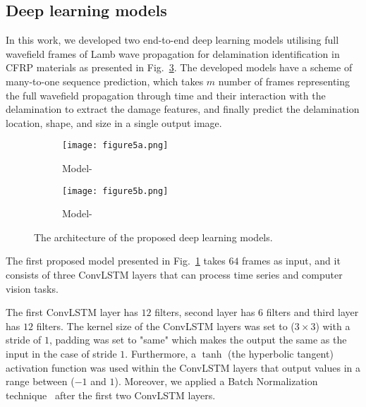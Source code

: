 \subsection{Deep learning models}
\label{proposed_approach}
In this work, we developed two end-to-end deep learning models utilising full wavefield frames of Lamb wave propagation for delamination identification in CFRP materials as presented in Fig.~\ref{fig:proposed_models}.
The developed models have a scheme of many-to-one sequence prediction, which takes \(m\) number of frames representing the full wavefield propagation through time and their interaction with the delamination to extract the damage features, and finally predict the delamination location, shape, and size in a single output image.
\begin{figure} [!h]
	\centering
	\begin{subfigure}[b]{0.49\textwidth}
		\centering
		\texttt{[image: figure5a.png]}
		\caption{Model-} %
		\label{fig:convlstm_model}
	\end{subfigure}
	\hfill
	\begin{subfigure}[b]{0.49\textwidth}
		\centering
		\texttt{[image: figure5b.png]}
		\caption{Model-} %
		\label{fig:AE_convlstm}
	\end{subfigure}
	\caption{The architecture of the proposed deep learning models.}
	\label{fig:proposed_models}
\end{figure} 

The first proposed model presented in Fig.~\ref{fig:convlstm_model} takes \(64\) frames as input, and it consists of three ConvLSTM layers that can process time series and computer vision tasks.

The first ConvLSTM layer has \(12\) filters, second layer has \(6\) filters and third layer has \(12\) filters.
The kernel size of the ConvLSTM layers was set to (\(3\times3\)) with a stride of \(1\), padding was set to "same" which makes the output the same as the input in the case of stride \(1\).
Furthermore, a \(\tanh\) (the hyperbolic tangent) activation function was used within the ConvLSTM layers that output values in a range between (\(-1\) and \(1\)).
Moreover, we applied a Batch Normalization technique~\cite{Santurkar2018} after the first two ConvLSTM layers.  

